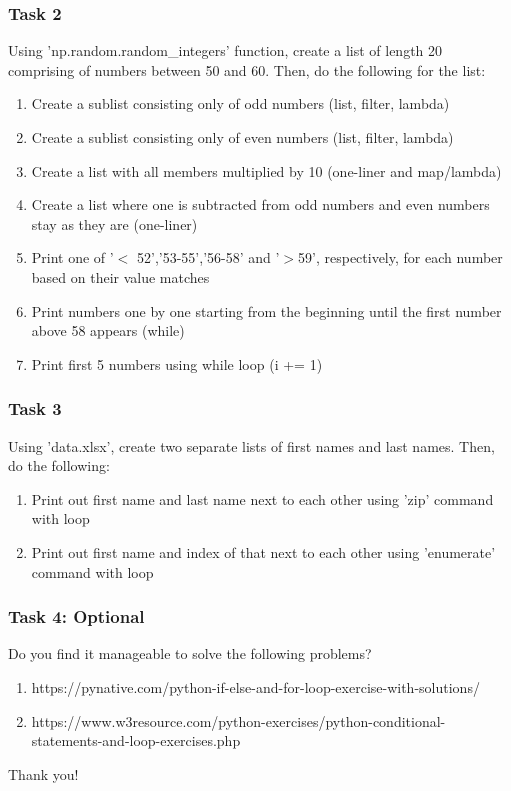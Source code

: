 \documentclass{beamer}
\begin{document}
\begin{frame}
    \frametitle{Task 2}
    Using 'np.random.random\_integers' function, create a list of length 20 comprising of numbers between 50 and 60. 
    Then, do the following for the list:
    \begin{enumerate}
        \item Create a sublist consisting only of odd numbers (list, filter, lambda)
        \item Create a sublist consisting only of even numbers (list, filter, lambda)
        \item Create a list with all members multiplied by 10 (one-liner and map/lambda)
        \item Create a list where one is subtracted from odd numbers and even numbers stay as they are (one-liner)
        \item Print one of '$<$ 52','53-55','56-58' and '$>$59', respectively, for each number based on their value matches
        \item Print numbers one by one starting from the beginning until the first number above 58 appears (while)
        \item Print first 5 numbers using while loop (i += 1)
    \end{enumerate}
\end{frame}

\begin{frame}
    \frametitle{Task 3}
    Using 'data.xlsx', create two separate lists of first names and last names. Then, do the following:
    \begin{enumerate}
        \item Print out first name and last name next to each other using 'zip' command with loop 
        \item Print out first name and index of that next to each other using 'enumerate' command with loop 
    \end{enumerate}
\end{frame}

\begin{frame}
    \frametitle{Task 4: Optional}
    Do you find it manageable to solve the following problems?
    \begin{enumerate}
        \item https://pynative.com/python-if-else-and-for-loop-exercise-with-solutions/
        \item https://www.w3resource.com/python-exercises/python-conditional-statements-and-loop-exercises.php
    \end{enumerate}
\end{frame}





\begin{frame}
\Huge{\centerline{Thank you!}}
\end{frame}

\end{document}
